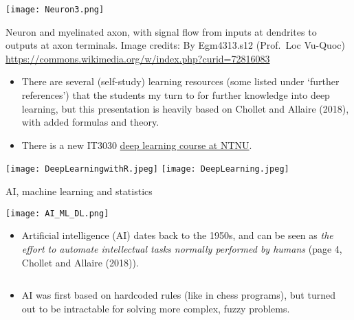 \documentclass[10pt,ignorenonframetext,]{beamer}
\providecommand{\tightlist}{%
  \setlength{\itemsep}{0pt}\setlength{\parskip}{0pt}}
\begin{document}
\begin{frame}

\centering

\texttt{[image: Neuron3.png]}

Neuron and myelinated axon, with signal flow from inputs at dendrites to
outputs at axon terminals. Image credits: By Egm4313.s12 (Prof.~Loc
Vu-Quoc) \url{https://commons.wikimedia.org/w/index.php?curid=72816083}

\end{frame}

\begin{frame}

\begin{itemize}
\tightlist
\item
  There are several (self-study) learning resources (some listed under
  `further references') that the students my turn to for further
  knowledge into deep learning, but this presentation is heavily based
  on Chollet and Allaire (2018), with added formulas and theory.
\item
  There is a new IT3030
  \href{https://www.ntnu.no/studier/emner/IT3030\#tab=omEmnet}{deep
  learning course at NTNU}.
\end{itemize}

\centering

\texttt{[image: DeepLearningwithR.jpeg]}
\texttt{[image: DeepLearning.jpeg]}

\end{frame}

\begin{frame}

\begin{block}{AI, machine learning and statistics}

\texttt{[image: AI\_ML\_DL.png]}

\end{block}

\end{frame}

\begin{frame}

\begin{itemize}
\tightlist
\item
  Artificial intelligence (AI) dates back to the 1950s, and can be seen
  as \emph{the effort to automate intellectual tasks normally performed
  by humans} (page 4, Chollet and Allaire (2018)).
\end{itemize}

\(~\)

\begin{itemize}
\tightlist
\item
  AI was first based on hardcoded rules (like in chess programs), but
  turned out to be intractable for solving more complex, fuzzy problems.
\end{itemize}

\(~\)

\end{frame}
\end{document}
